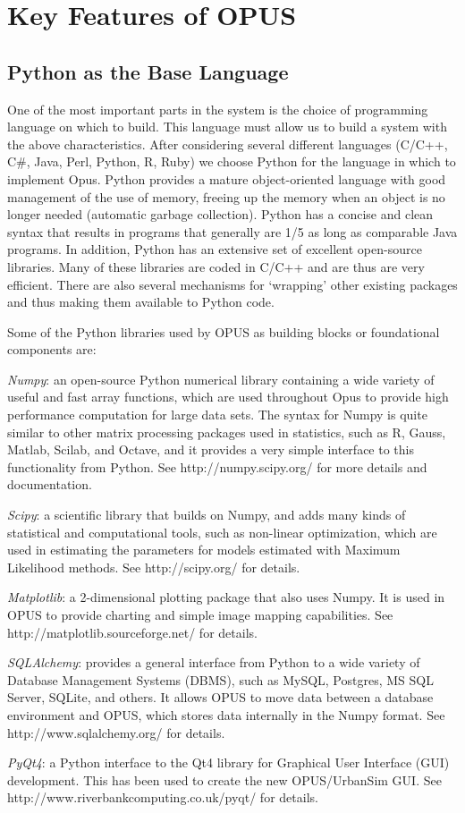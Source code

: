 \section{Key Features of OPUS}
\subsection{Python as the Base Language}
One of the most important parts in the system is the choice of programming language on which to build.  This language must allow us to build a system with the above characteristics.  
After considering several different languages (C/C++, C\#, Java, Perl, Python, R, Ruby) we choose Python for the language in which to implement Opus. Python provides a mature object-oriented language with good management of the use of memory, freeing up the memory when an object is no longer needed (automatic garbage collection).  Python has a concise and clean syntax that results in programs that generally are 1/5 as long as comparable Java programs.  In addition, Python has an extensive set of excellent open-source libraries.  Many of these libraries are coded in C/C++ and are thus are very efficient.  There are also several mechanisms for `wrapping' other existing packages and thus making them available to Python code.  

Some  of the Python libraries used by OPUS as building blocks or foundational components are:
\squishlist
\item \emph{Numpy}: an open-source Python numerical library containing a wide variety of useful and fast array functions, which are used throughout Opus to provide high performance computation for large data sets.  The syntax for Numpy is quite similar to other matrix processing packages used in statistics, such as R, Gauss, Matlab, Scilab, and Octave, and it provides a very simple interface to this functionality from Python.  See http://numpy.scipy.org/ for more details and documentation.
\item \emph{Scipy}: a scientific library that builds on Numpy, and adds many kinds of statistical and computational tools, such as non-linear optimization, which are used in estimating the parameters for models estimated with Maximum Likelihood methods.  See http://scipy.org/ for details.
\item \emph{Matplotlib}: a 2-dimensional plotting package that also uses Numpy.  It is used in OPUS to provide charting and simple image mapping capabilities.  See http://matplotlib.sourceforge.net/ for details.
\item \emph{SQLAlchemy}: provides a general interface from Python to a wide variety of Database Management Systems (DBMS), such as MySQL, Postgres, MS SQL Server, SQLite, and others.  It allows OPUS to move data between a database environment and OPUS, which stores data internally in the Numpy format.  See http://www.sqlalchemy.org/ for details.
\item \emph{PyQt4}: a Python interface to the Qt4 library for Graphical User Interface (GUI) development.  This has been used to create the new OPUS/UrbanSim GUI.  See http://www.riverbankcomputing.co.uk/pyqt/ for details.
\squishend

